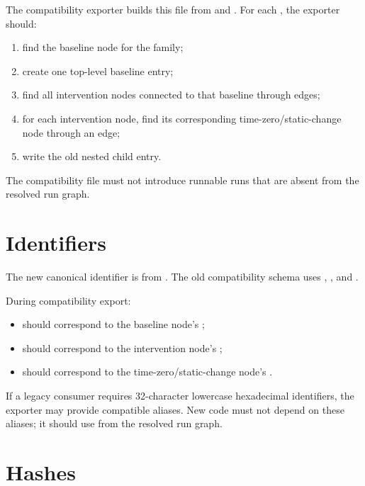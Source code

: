 \documentclass[11pt]{article}
\begin{document}
The compatibility exporter builds this file from  and .
For each , the exporter should:

\begin{enumerate}
\item find the baseline node for the family;
\item create one top-level baseline entry;
\item find all intervention nodes connected to that baseline through  edges;
\item for each intervention node, find its corresponding time-zero/static-change node through an  edge;
\item write the old nested child entry.
\end{enumerate}

The compatibility file must not introduce runnable runs that are absent from the resolved run graph.

\section*{Identifiers}

The new canonical identifier is  from .
The old compatibility schema uses , , and .

During compatibility export:

\begin{itemize}
\item {} should correspond to the baseline node's ;
\item {} should correspond to the intervention node's ;
\item {} should correspond to the time-zero/static-change node's .
\end{itemize}

If a legacy consumer requires 32-character lowercase hexadecimal identifiers, the exporter may provide compatible aliases.
New code must not depend on these aliases; it should use  from the resolved run graph.

\section*{Hashes}
\end{document}
